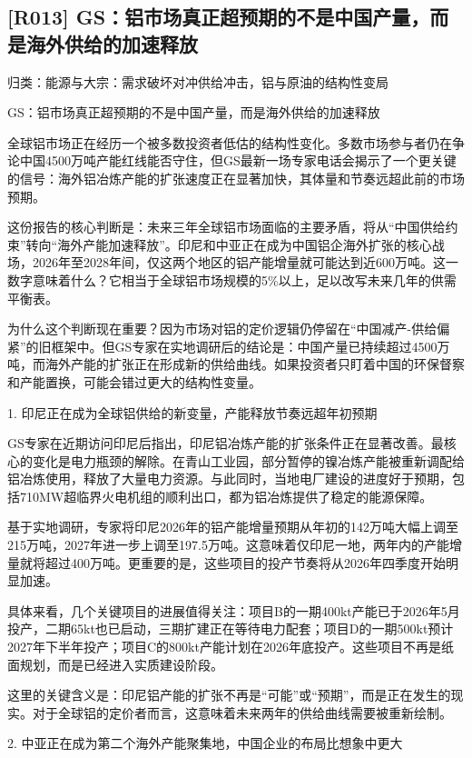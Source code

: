 \documentclass[11pt]{ctexart}
\begin{document}
\subsection{[R013] GS：铝市场真正超预期的不是中国产量，而是海外供给的加速释放}
{\small\color{refgray}归类：能源与大宗：需求破坏对冲供给冲击，铝与原油的结构性变局}

GS：铝市场真正超预期的不是中国产量，而是海外供给的加速释放

全球铝市场正在经历一个被多数投资者低估的结构性变化。多数市场参与者仍在争论中国4500万吨产能红线能否守住，但GS最新一场专家电话会揭示了一个更关键的信号：海外铝冶炼产能的扩张速度正在显著加快，其体量和节奏远超此前的市场预期。

这份报告的核心判断是：未来三年全球铝市场面临的主要矛盾，将从“中国供给约束”转向“海外产能加速释放”。印尼和中亚正在成为中国铝企海外扩张的核心战场，2026年至2028年间，仅这两个地区的铝产能增量就可能达到近600万吨。这一数字意味着什么？它相当于全球铝市场规模的5\%以上，足以改写未来几年的供需平衡表。

为什么这个判断现在重要？因为市场对铝的定价逻辑仍停留在“中国减产-供给偏紧”的旧框架中。但GS专家在实地调研后的结论是：中国产量已持续超过4500万吨，而海外产能的扩张正在形成新的供给曲线。如果投资者只盯着中国的环保督察和产能置换，可能会错过更大的结构性变量。

1. 印尼正在成为全球铝供给的新变量，产能释放节奏远超年初预期

GS专家在近期访问印尼后指出，印尼铝冶炼产能的扩张条件正在显著改善。最核心的变化是电力瓶颈的解除。在青山工业园，部分暂停的镍冶炼产能被重新调配给铝冶炼使用，释放了大量电力资源。与此同时，当地电厂建设的进度好于预期，包括710MW超临界火电机组的顺利出口，都为铝冶炼提供了稳定的能源保障。

基于实地调研，专家将印尼2026年的铝产能增量预期从年初的142万吨大幅上调至215万吨，2027年进一步上调至197.5万吨。这意味着仅印尼一地，两年内的产能增量就将超过400万吨。更重要的是，这些项目的投产节奏将从2026年四季度开始明显加速。

具体来看，几个关键项目的进展值得关注：项目B的一期400kt产能已于2026年5月投产，二期65kt也已启动，三期扩建正在等待电力配套；项目D的一期500kt预计2027年下半年投产；项目C的800kt产能计划在2026年底投产。这些项目不再是纸面规划，而是已经进入实质建设阶段。

这里的关键含义是：印尼铝产能的扩张不再是“可能”或“预期”，而是正在发生的现实。对于全球铝的定价者而言，这意味着未来两年的供给曲线需要被重新绘制。

2. 中亚正在成为第二个海外产能聚集地，中国企业的布局比想象中更大
\end{document}
